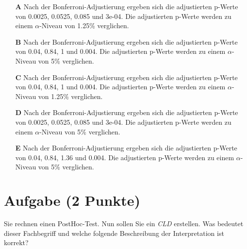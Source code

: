 \documentclass[a4paper, 9pt]{scrartcl}\usepackage[]{graphicx}\usepackage[]{xcolor}
\begin{document}
\begin{enumerate}
\item [\textbf{A} \msquare] Nach der Bonferroni-Adjustierung ergeben sich die adjustierten p-Werte von 0.0025, 0.0525, 0.085 und 3e-04. Die adjustierten p-Werte werden zu einem $\alpha$-Niveau von 1.25\% verglichen.
\item [\textbf{B} \msquare] Nach der Bonferroni-Adjustierung ergeben sich die adjustierten p-Werte von 0.04, 0.84, 1 und 0.004. Die adjustierten p-Werte werden zu einem $\alpha$-Niveau von 5\% verglichen.
\item [\textbf{C} \msquare] Nach der Bonferroni-Adjustierung ergeben sich die adjustierten p-Werte von 0.04, 0.84, 1 und 0.004. Die adjustierten p-Werte werden zu einem $\alpha$-Niveau von 1.25\% verglichen.
\item [\textbf{D} \msquare] Nach der Bonferroni-Adjustierung ergeben sich die adjustierten p-Werte von 0.0025, 0.0525, 0.085 und 3e-04. Die adjustierten p-Werte werden zu einem $\alpha$-Niveau von 5\% verglichen.
\item [\textbf{E} \msquare] Nach der Bonferroni-Adjustierung ergeben sich die adjustierten p-Werte von 0.04, 0.84, 1.36 und 0.004. Die adjustierten p-Werte werden zu einem $\alpha$-Niveau von 5\% verglichen.
\end{enumerate}

\section{Aufgabe \hfill (2 Punkte)}



Sie rechnen einen PostHoc-Test. Nun sollen Sie ein \textit{CLD} erstellen. Was bedeutet dieser Fachbegriff und welche folgende Beschreibung der Interpretation ist korrekt?
\end{document}
